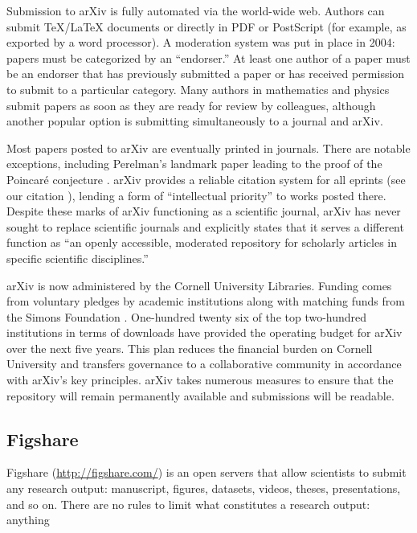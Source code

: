\documentclass[letterpaper,twocolumn,superscriptaddress,showkeys]{revtex4}
\begin{document}
Submission to arXiv is fully automated via the world-wide web.
Authors can submit \TeX{}/\LaTeX{} documents or directly in PDF or
PostScript (for example, as exported by a word processor).  A
moderation system was put in place in 2004: papers must be categorized
by an ``endorser.''  At least one author of a paper must be an
endorser that has previously submitted a paper or has received
permission to submit to a particular category.  Many authors in
mathematics and physics submit papers as soon as they are ready for
review by colleagues, although another popular option is submitting
simultaneously to a journal and arXiv.

Most papers posted to arXiv are eventually printed in journals.  There
are notable exceptions, including Perelman's landmark paper leading to
the proof of the Poincar\'{e} conjecture \cite{2002math.....11159P}.
arXiv provides a reliable citation system for all eprints (see our
citation \cite{2002math.....11159P}), lending a form of ``intellectual
priority'' to works posted there.  Despite these marks of arXiv 
functioning as a scientific journal, arXiv has never sought to replace
scientific journals and explicitly states that it serves a different
function as ``an openly accessible, moderated repository for scholarly
articles in specific scientific disciplines.''

arXiv is now administered by the Cornell University Libraries.
Funding comes from voluntary pledges by academic institutions along
with matching funds from the Simons Foundation \cite{arxiv_future}.
One-hundred twenty six of the top two-hundred institutions in terms of
downloads have provided the operating budget for arXiv over the next
five years.  This plan reduces the financial burden on Cornell
University and transfers governance to a collaborative community in
accordance with arXiv's key principles.  arXiv takes numerous measures
to ensure that the repository will remain permanently available and
submissions will be readable.

\subsection{Figshare}


Figshare (\href{http://figshare.com/}{http://figshare.com/}) is an open servers
that allow scientists to submit any research output: manuscript, figures,
datasets, videos, theses, presentations, and so on. There are no rules to limit
what constitutes a research output: anything
\end{document}
